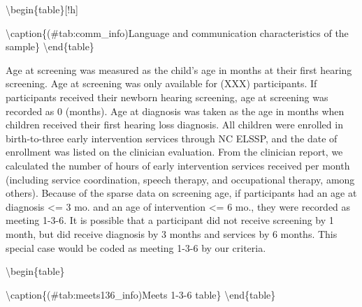 \documentclass[english,man,floatsintext]{apa6}
\begin{document}
\textbackslash{}begin\{table\}{[}!h{]}

\textbackslash{}caption\{(\#tab:comm\_info)Language and communication characteristics of the sample\}
\centering
{}
\textbackslash{}end\{table\}

Age at screening was measured as the child's age in months at their first hearing screening. Age at screening was only available for (XXX) participants. If participants received their newborn hearing screening, age at screening was recorded as 0 (months). Age at diagnosis was taken as the age in months when children received their first hearing loss diagnosis. All children were enrolled in birth-to-three early intervention services through NC ELSSP, and the date of enrollment was listed on the clinician evaluation. From the clinician report, we calculated the number of hours of early intervention services received per month (including service coordination, speech therapy, and occupational therapy, among others).
Because of the sparse data on screening age, if participants had an age at diagnosis \textless{}= 3 mo. and an age of intervention \textless{}= 6 mo., they were recorded as meeting 1-3-6. It is possible that a participant did not receive screening by 1 month, but did receive diagnosis by 3 months and services by 6 months. This special case would be coded as meeting 1-3-6 by our criteria.

\textbackslash{}begin\{table\}

\textbackslash{}caption\{(\#tab:meets136\_info)Meets 1-3-6 table\}
\centering
{}
\textbackslash{}end\{table\}
\end{document}
